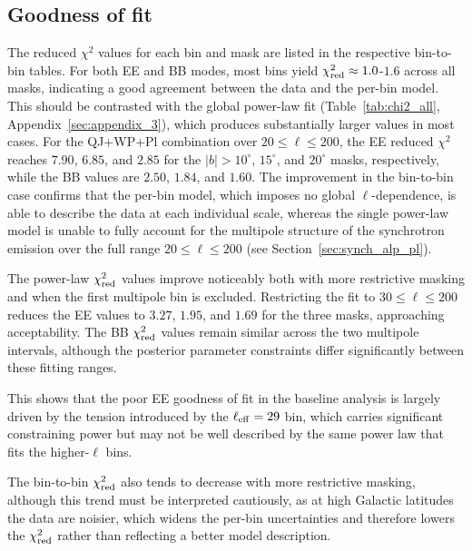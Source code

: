 \subsection{Goodness of fit}

The reduced $\chi^2$ values for each bin and mask are listed in the respective bin-to-bin tables. For both EE and BB modes, most bins yield $\chi^2_{\rm red} \approx 1.0$-$1.6$ across all masks, indicating a good agreement between the data and the per-bin model. This should be contrasted with the global power-law fit (Table~\ref{tab:chi2_all}, Appendix~\ref{sec:appendix_3}), which produces substantially larger values in most cases. For the QJ+WP+Pl combination over $20 \leq \ell \leq 200$, the EE reduced $\chi^2$ reaches $7.90$, $6.85$, and $2.85$ for the $|b| > 10^\circ$, $15^\circ$, and $20^\circ$ masks, respectively, while the BB values are $2.50$, $1.84$, and $1.60$. The improvement in the bin-to-bin case confirms that the per-bin model, which imposes no global $\ell$-dependence, is able to describe the data at each individual scale, whereas the single power-law model is unable to fully account for the multipole structure of the synchrotron emission over the full range $20 \leq \ell \leq 200$ (see Section~\ref{sec:synch_alp_pl}).

The power-law $\chi^2_{\rm red}$ values improve noticeably both with more restrictive masking and when the first multipole bin is excluded. Restricting the fit to $30 \leq \ell \leq 200$ reduces the EE values to $3.27$, $1.95$, and $1.69$ for the three masks, approaching acceptability. The BB $\chi^2_{\rm red}$ values remain similar across the two multipole intervals, although the posterior parameter constraints differ significantly between these fitting ranges. 

This shows that the poor EE goodness of fit in the baseline analysis is largely driven by the tension introduced by the $\ell_{\rm eff} = 29$ bin, which carries significant constraining power but may not be well described by the same power law that fits the higher-$\ell$ bins. 

The bin-to-bin $\chi^2_{\rm red}$ also tends to decrease with more restrictive masking, although this trend must be interpreted cautiously, as at high Galactic latitudes the data are noisier, which widens the per-bin uncertainties and therefore lowers the $\chi^2_{\rm red}$ rather than reflecting a better model description.













